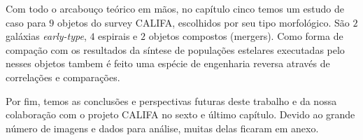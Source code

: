 Com todo o arcabouço teórico em mãos, no capítulo cinco temos um estudo de caso
para $9$ objetos do survey CALIFA, escolhidos por seu tipo morfológico. São $2$
galáxias {\em early-type}, $4$ espirais e $2$ objetos compostos (mergers).
Como forma de compação com os resultados da síntese de populações estelares executadas pelo
\starlight nesses objetos tambem é feito uma espécie de engenharia reversa
através de correlações e comparações.

Por fim, temos as conclusões e perspectivas futuras deste trabalho e da nossa
colaboração com o projeto CALIFA no sexto e último capítulo. \ojo Devido ao
grande número de imagens e dados para análise, muitas delas ficaram em anexo.

